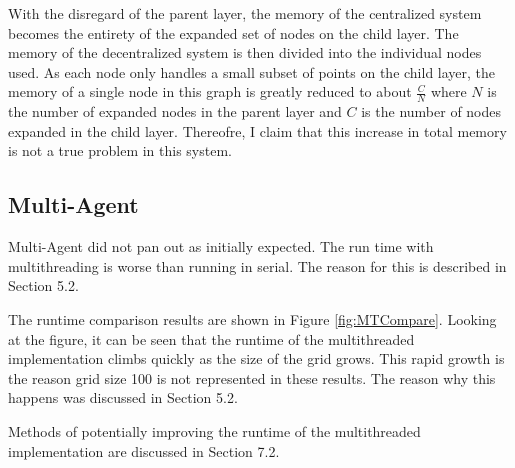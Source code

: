 With the disregard of the parent layer, the memory of the centralized system becomes the entirety of the expanded set of nodes on the child layer. The memory of the decentralized system is then divided into the individual nodes used. As each node only handles a small subset of points on the child layer, the memory of a single node in this graph is greatly reduced to about $\frac{C}{N}$ where $N$ is the number of expanded nodes in the parent layer and $C$ is the number of nodes expanded in the child layer. Thereofre, I claim that this increase in total memory is not a true problem in this system.

	
	
\subsection{Multi-Agent}
Multi-Agent did not pan out as initially expected. The run time with multithreading is worse than running in serial. The reason for this is described in Section 5.2. 

The runtime comparison results are shown in Figure \ref{fig:MTCompare}. Looking at the figure, it can be seen that the runtime of the multithreaded implementation climbs quickly as the size of the grid grows. This rapid growth is the reason grid size 100 is not represented in these results. The reason why this happens was discussed in Section 5.2.

Methods of potentially improving the runtime of the multithreaded implementation are discussed in Section 7.2.

